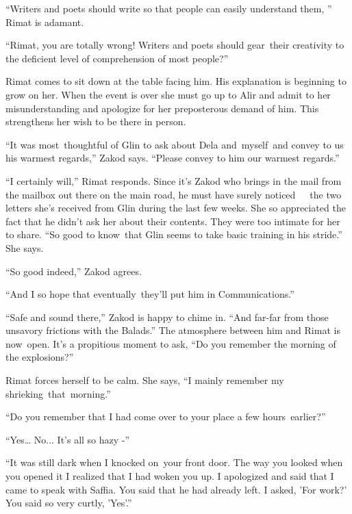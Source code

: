 \documentclass[twoside,11pt]{book}
\begin{document}
``Writers and poets should write so that people can easily understand them, '' Rimat is
adamant.\ 

``Rimat, you are totally wrong! Writers and poets should gear~their creativity to the deficient level of
comprehension of most people?'' 

Rimat comes to sit down at the table facing him. His explanation is beginning to grow on her. When the event is over she
must go up to Alir and admit to her misunderstanding and apologize for her preposterous demand of him. This strengthens
her wish to be there in person.\ \ 

``It was most\ thoughtful of Glin to ask about Dela and{\ }myself\ and convey to us his
warmest regards,'' Zakod says. ``Please convey to him our warmest regards.''

``I certainly will,'' Rimat responds. Since it's Zakod who brings in the mail from the mailbox
out there on the main road, he must have surely noticed\ \ \ the two letters she's received from Glin during the last
few weeks. She so appreciated the fact that he didn't ask her about their contents. They were too intimate for her to
share. ``So good to know\ that Glin seems to take basic training in his stride.'' She says.\ 

``So good indeed,'' Zakod agrees. 

``And I so hope that eventually\ they'll put him in Communications.'' 

``Safe and sound there,'' Zakod is happy to chime in. ``And far-far from those
unsavory frictions with the Balads.'' The atmosphere between him and Rimat is now\ open. It's a propitious
moment to ask, ``Do you remember the morning of the explosions?'' 

Rimat forces herself to be calm. She says, ``I mainly remember my shrieking~that\ morning.'' 

``Do you remember that I had come over to your place a few hours~earlier?'' 

``Yes{\dots} No... It's all so hazy -'' 

``It was still dark when I knocked on\ your front door. The way you looked when you opened it I realized
that I had woken you up. I apologized and said that I came to speak with Saffia. You said that he had already left. I
asked, 'For work?' You said so very curtly, 'Yes'.'' 
\end{document}
